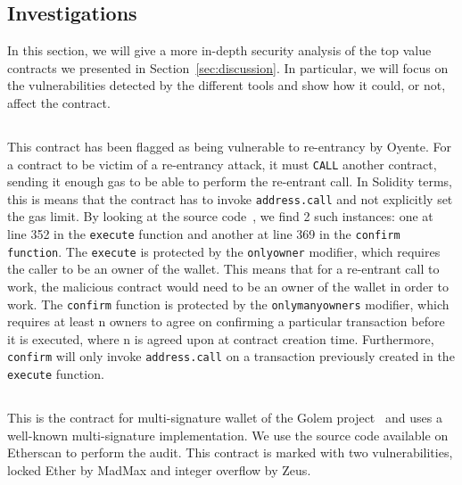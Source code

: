 \subsection{Investigations}
\label{sec:investigations}
In this section, we will give a more in-depth security analysis of the top value contracts we presented in Section~\ref{sec:discussion}. In particular, we will focus on the vulnerabilities detected by the different tools and show how it could, or not, affect the contract.

\subsection*{}
  This contract has been flagged as being vulnerable to re-entrancy by Oyente. For a contract to be victim of a re-entrancy attack, it must \lstinline{CALL} another contract, sending it enough gas to be able to perform the re-entrant call. In Solidity terms, this is means that the contract has to invoke \lstinline{address.call} and not explicitly set the gas limit. By looking at the source code~\cite{ether-foundation-contract-code}, we find 2 such instances: one at line 352 in the \lstinline{execute} function and another at line 369 in the \lstinline{confirm function}. The \lstinline{execute} is protected by the \lstinline{onlyowner} modifier, which requires the caller to be an owner of the wallet. This means that for a re-entrant call to work, the malicious contract would need to be an owner of the wallet in order to work. The \lstinline{confirm} function is protected by the \lstinline{onlymanyowners} modifier, which requires at least n owners to agree on confirming a particular transaction before it is executed, where n is agreed upon at contract creation time. Furthermore, \lstinline{confirm} will only invoke \lstinline{address.call} on a transaction previously created in the \lstinline{execute} function.

\subsection*{}
This is the contract for multi-signature wallet of the Golem project~\cite{golem-project} and uses a well-known multi-signature implementation. We use the source code available on Etherscan to perform the audit.
This contract is marked with two vulnerabilities, locked Ether by MadMax and integer overflow by Zeus.

